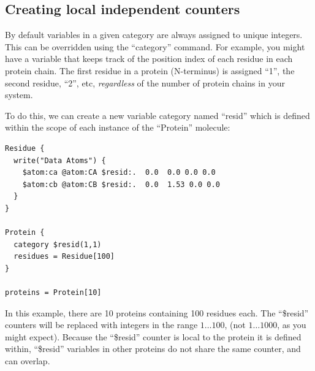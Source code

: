 \documentclass[11pt]{article}
\begin{document}

\subsection{Creating local independent counters}
\label{sec:cpath_simple}
By default variables in a given category are always assigned
to unique integers.
This can be overridden using the ``category'' command.
For example, you might have a variable that keeps track of
the position index of each residue in each protein chain.
The first residue in a protein (N-terminus) is assigned ``1'',
the second residue, ``2'', etc, 
\textit{regardless} of the number of protein chains in your system.

To do this, we can create a new variable category named ``resid'' which 
is defined within the scope of each instance of the ``Protein'' molecule:
\begin{verbatim}
Residue {
  write("Data Atoms") {
    $atom:ca @atom:CA $resid:.  0.0  0.0 0.0 0.0
    $atom:cb @atom:CB $resid:.  0.0  1.53 0.0 0.0
  }
}

Protein {
  category $resid(1,1)
  residues = Residue[100]
}

proteins = Protein[10]
\end{verbatim}
In this example, there are 10 proteins containing 100 residues each.
The ``\$resid'' counters will be replaced with integers in the range
$1\ldots 100$,
(not $1\ldots 1000$, as you might expect).
Because the ``\$resid'' counter is local to the 
protein it is defined within,
``\$resid'' variables in other proteins do not share the same counter,
and can overlap.
\end{document}
